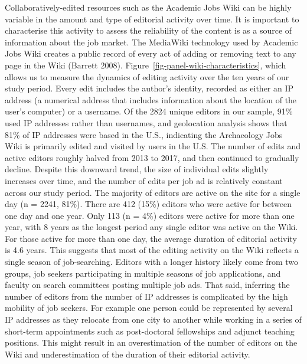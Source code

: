 \documentclass[
  12pt,
]{article}
\begin{document}
Collaboratively-edited resources such as the Academic Jobs Wiki can be
highly variable in the amount and type of editorial activity over time.
It is important to characterise this activity to assess the reliability
of the content is as a source of information about the job market. The
MediaWiki technology used by Academic Jobs Wiki creates a public record
of every act of adding or removing text to any page in the Wiki (Barrett
2008). Figure~\ref{fig-panel-wiki-characteristics}, which allows us to
measure the dynamics of editing activity over the ten years of our study
period. Every edit includes the author's identity, recorded as either an
IP address (a numerical address that includes information about the
location of the user's computer) or a username. Of the 2824 unique
editors in our sample, 91\% used IP addresses rather than usernames, and
geolocation analysis shows that 81\% of IP addresses were based in the
U.S., indicating the Archaeology Jobs Wiki is primarily edited and
visited by users in the U.S. The number of edits and active editors
roughly halved from 2013 to 2017, and then continued to gradually
decline. Despite this downward trend, the size of individual edits
slightly increases over time, and the number of edits per job ad is
relatively constant across our study period. The majority of editors are
active on the site for a single day (n = 2241, 81\%). There are 412
(15\%) editors who were active for between one day and one year. Only
113 (n = 4\%) editors were active for more than one year, with 8 years
as the longest period any single editor was active on the Wiki. For
those active for more than one day, the average duration of editorial
activity is 4.6 years. This suggests that most of the editing activity
on the Wiki reflects a single season of job-searching. Editors with a
longer history likely come from two groups, job seekers participating in
multiple seasons of job applications, and faculty on search committees
posting multiple job ads. That said, inferring the number of editors
from the number of IP addresses is complicated by the high mobility of
job seekers. For example one person could be represented by several IP
addresses as they relocate from one city to another while working in a
series of short-term appointments such as post-doctoral fellowships and
adjunct teaching positions. This might result in an overestimation of
the number of editors on the Wiki and underestimation of the duration of
their editorial activity.
\end{document}
